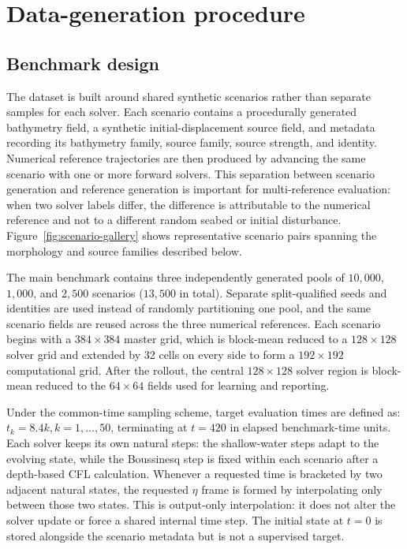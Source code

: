 \section{Data-generation procedure}
\label{sec:data-generation}

\subsection{Benchmark design}
\label{subsec:benchmark-design}

The dataset is built around shared synthetic scenarios rather than separate samples for each solver. Each scenario contains a procedurally generated bathymetry field, a synthetic initial-displacement source field, and metadata recording its bathymetry family, source family, source strength, and identity. Numerical reference trajectories are then produced by advancing the same scenario with one or more forward solvers. This separation between scenario generation and reference generation is important for multi-reference evaluation: when two solver labels differ, the difference is attributable to the numerical reference and not to a different random seabed or initial disturbance. Figure~\ref{fig:scenario-gallery} shows representative scenario pairs spanning the morphology and source families described below.

The main benchmark contains three independently generated pools of $10{,}000$, $1{,}000$, and $2{,}500$ scenarios ($13{,}500$ in total). Separate split-qualified seeds and identities are used instead of randomly partitioning one pool, and the same scenario fields are reused across the three numerical references. Each scenario begins with a $384 \times 384$ master grid, which is block-mean reduced to a $128 \times 128$ solver grid and extended by 32 cells on every side to form a $192 \times 192$ computational grid. After the rollout, the central $128 \times 128$ solver region is block-mean reduced to the $64 \times 64$ fields used for learning and reporting.

Under the common-time sampling scheme, target evaluation times are defined as: $t_k = 8.4k, k = 1, \dots, 50$, terminating at $t = 420$ in elapsed benchmark-time units. Each solver keeps its own natural steps: the shallow-water steps adapt to the evolving state, while the Boussinesq step is fixed within each scenario after a depth-based CFL calculation. Whenever a requested time is bracketed by two adjacent natural states, the requested $\eta$ frame is formed by interpolating only between those two states. This is output-only interpolation: it does not alter the solver update or force a shared internal time step. The initial state at $t = 0$ is stored alongside the scenario metadata but is not a supervised target.

